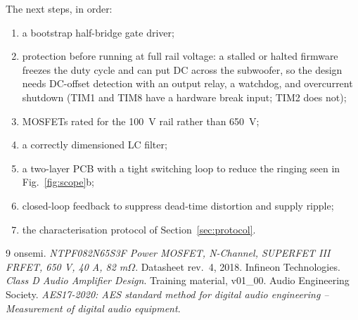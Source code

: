 \documentclass[10pt,a4paper]{article}
\begin{document}
The next steps, in order:
\begin{enumerate}
\item a bootstrap half-bridge gate driver;
\item protection before running at full rail voltage: a stalled or halted firmware freezes the duty cycle and can put DC across the subwoofer, so the design needs DC-offset detection with an output relay, a watchdog, and overcurrent shutdown (TIM1 and TIM8 have a hardware break input; TIM2 does not);
\item MOSFETs rated for the \SI{100}{\volt} rail rather than \SI{650}{\volt};
\item a correctly dimensioned LC filter;
\item a two-layer PCB with a tight switching loop to reduce the ringing seen in Fig.~\ref{fig:scope}b;
\item closed-loop feedback to suppress dead-time distortion and supply ripple;
\item the characterisation protocol of Section~\ref{sec:protocol}.
\end{enumerate}

\begin{thebibliography}{9}\small
{} onsemi. \textit{NTPF082N65S3F Power MOSFET, N-Channel, SUPERFET III FRFET, 650 V, 40 A, 82 m$\Omega$}. Datasheet rev.~4, 2018.
 Infineon Technologies. \textit{Class D Audio Amplifier Design}. Training material, v01\_00.
 Audio Engineering Society. \textit{AES17-2020: AES standard method for digital audio engineering -- Measurement of digital audio equipment}.
\end{thebibliography}
\end{document}
